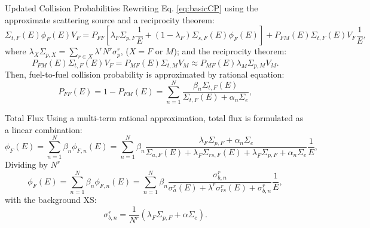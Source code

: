 \documentclass[sans,mathserif,aspectratio=169, 10pt]{beamer}
\begin{document}
\begin{frame}{Updated Collision Probabilities}
Rewriting Eq. \ref{eq:basicCP} using the approximate scattering source and a reciprocity theorem:
\begin{equation}
\Sigma_{t,F}(E) \phi_F (E) V_F = P_{FF} \left[\lambda_F \Sigma_{p,F} \frac{1}{E} + (1-\lambda_F) \Sigma_{s,F} (E) \phi_F (E)  \right]
+ P_{FM} (E) \Sigma_{t,F} (E) V_F \frac{1}{E},
\end{equation}
\pause
where $\lambda_X \Sigma_{p,X} = \sum_{r \in X} \lambda^r N^r \sigma_p^r$, ($X=F$ or $M$); and the reciprocity theorem: 
\begin{equation}
P_{FM} (E) \Sigma_{t,F} (E) V_F = P_{MF} (E) \Sigma_{t,M} V_M \approx P_{MF} (E) \lambda_M \Sigma_{p,M} V_M.
\end{equation}
\pause
Then, fuel-to-fuel collision probability is approximated by rational equation:
\begin{equation}
P_{FF} (E) = 1 - P_{FM} (E) = \sum_{n=1}^N \frac{\beta_n \Sigma_{t,F} (E)}{\Sigma_{t,F} (E) + \alpha_n \Sigma_e},
\end{equation}
\end{frame}

\begin{frame}{Total Flux}
Using a multi-term rational approximation, total flux is formulated as a linear combination:
\begin{equation}
\phi_F (E) = \sum_{n=1}^N \beta_n \phi_{F,n} (E) = \sum_{n=1}^N \beta_n \frac{\lambda_F \Sigma_{p,F} + \alpha_n \Sigma_e}{\Sigma_{a,F} (E) + \lambda_F \Sigma_{rs,F} (E) + \lambda_F \Sigma_{p,F} + \alpha_n \Sigma_e} \frac{1}{E},
\end{equation}
\pause
Dividing by $N^r$
\begin{equation}
\phi_F (E) = \sum_{n=1}^N \beta_n \phi_{F,n} (E) = \sum_{n=1}^N \beta_n \frac{\sigma_{b,n}^r}{\sigma_{a}^r (E) + \lambda^r \sigma_{rs}^r (E) + \sigma_{b,n}^r} \frac{1}{E},
\end{equation}
\pause
with the background XS:
\begin{equation}
\sigma_{b,n}^r = \frac{1}{N^r} (\lambda_F \Sigma_{p,F} + \alpha \Sigma_e).
\end{equation}
\end{frame}
\end{document}
